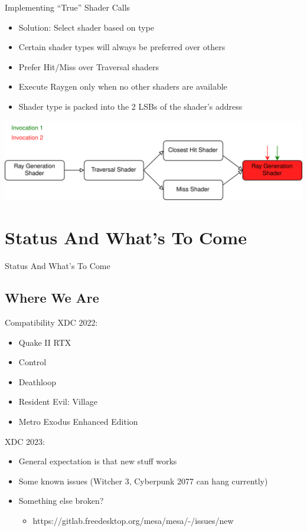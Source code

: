 \documentclass[aspectratio=169,t]{beamer}
\begin{document}
\begin{slide}{Implementing ``True'' Shader Calls}
 \begin{itemize}
  \item Solution: Select shader based on type
  \item Certain shader types will always be preferred over others
  \item Prefer Hit/Miss over Traversal shaders
  \item Execute Raygen only when no other shaders are available
  \item Shader type is packed into the 2 LSBs of the shader's address
 \end{itemize}
 \includegraphics[width=\textwidth]{graphics/RTStages2-8.png}
\end{slide}

\section{Status And What's To Come}

\chapterIntroConfig
\begin{slide}{Status And What's To Come}
\end{slide}

\subsection{Where We Are}
\begin{slide}{Compatibility}
 XDC 2022: \\
 \begin{itemize}
  \item Quake II RTX
  \item Control
  \item Deathloop
  \item Resident Evil: Village
  \item Metro Exodus Enhanced Edition
 \end{itemize}

 \pause

 \vspace{12pt}

 XDC 2023: \\
 \begin{itemize}
  \item General expectation is that new stuff works
  \item Some known issues (Witcher 3, Cyberpunk 2077 can hang currently)
  \item Something else broken?
  \begin{itemize}
   \item https://gitlab.freedesktop.org/mesa/mesa/-/issues/new
  \end{itemize}
 \end{itemize}
\end{slide}
\end{document}
